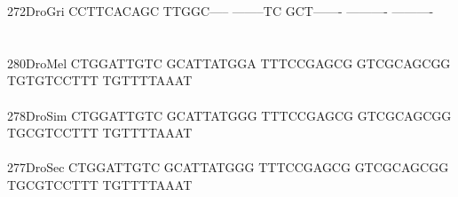 \documentclass[11pt,twoside,reqno,a4paper]{article}
\begin{document}
{272\hspace*{1\charwidth}DroGri	CCTTCACAGC	TTGGC-----	--------TC	GCT-------	----------	----------	\\
\hspace*{4\charwidth}\hspace*{7\charwidth}\hspace*{1\charwidth}\hspace*{1\charwidth}\hspace*{1\charwidth}\hspace*{1\charwidth}\hspace*{1\charwidth}\hspace*{1\charwidth}\\
\\
280\hspace*{1\charwidth}DroMel	CTGGATTGTC	GCATTATGGA	TTTCCGAGCG	GTCGCAGCGG	TGTGTCCTTT	TGTTTTAAAT	\\
\hspace*{4\charwidth}\hspace*{7\charwidth}\hspace*{1\charwidth}\hspace*{1\charwidth}\hspace*{1\charwidth}\hspace*{1\charwidth}\hspace*{1\charwidth}\hspace*{1\charwidth}\\
278\hspace*{1\charwidth}DroSim	CTGGATTGTC	GCATTATGGG	TTTCCGAGCG	GTCGCAGCGG	TGCGTCCTTT	TGTTTTAAAT	\\
\hspace*{4\charwidth}\hspace*{7\charwidth}\hspace*{1\charwidth}\hspace*{1\charwidth}\hspace*{1\charwidth}\hspace*{1\charwidth}\hspace*{1\charwidth}\hspace*{1\charwidth}\\
277\hspace*{1\charwidth}DroSec	CTGGATTGTC	GCATTATGGG	TTTCCGAGCG	GTCGCAGCGG	TGCGTCCTTT	TGTTTTAAAT	\\
\hspace*{4\charwidth}\hspace*{7\charwidth}\hspace*{1\charwidth}\hspace*{1\charwidth}\hspace*{1\charwidth}\hspace*{1\charwidth}\hspace*{1\charwidth}\hspace*{1\charwidth}\\
}
\end{document}
